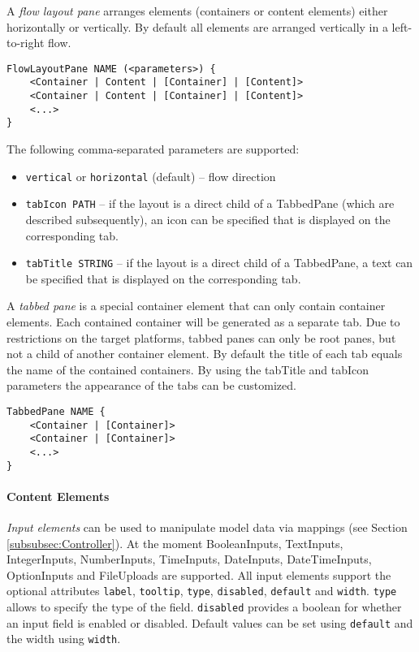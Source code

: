 A \textit{flow layout pane} arranges elements (containers or content elements) either horizontally or vertically. By default all elements are arranged vertically in a left-to-right flow.
\begin{lstlisting}
FlowLayoutPane NAME (<parameters>) {
	<Container | Content | [Container] | [Content]>
	<Container | Content | [Container] | [Content]>
	<...>
}
\end{lstlisting}
The following comma-separated parameters are supported:
\begin{itemize}
\item \lstinline!vertical! or \lstinline!horizontal! (default) -- flow direction
\item \lstinline!tabIcon PATH! -- if the layout is a direct child of a TabbedPane (which are described subsequently), an icon can be specified that is displayed on the corresponding tab.
\item \lstinline!tabTitle STRING! -- if the layout is a direct child of a TabbedPane, a text can be specified that is displayed on the corresponding tab.
\end{itemize}

A \textit{tabbed pane} is a special container element that can only contain container elements. Each contained container will be generated as a separate tab. Due to restrictions on the target platforms, tabbed panes can only be root panes, but not a child of another container element. By default the title of each tab equals the name of the contained containers. By using the tabTitle and tabIcon parameters the appearance of the tabs can be customized.
\begin{lstlisting}
TabbedPane NAME {
	<Container | [Container]>
	<Container | [Container]>
	<...>
}
\end{lstlisting}

\paragraph{Content Elements}
\textit{Input elements} can be used to manipulate model data via mappings (see Section \ref{subsubsec:Controller}). At the moment BooleanInputs, TextInputs, IntegerInputs, NumberInputs, TimeInputs, DateInputs, DateTimeInputs, OptionInputs and FileUploads are supported. All input elements support the optional attributes \lstinline!label!, \lstinline!tooltip!, \lstinline!type!, \lstinline!disabled!, \lstinline!default! and \lstinline!width!. \lstinline!type! allows to specify the type of the field. \lstinline!disabled! provides a boolean for whether an input field is enabled or disabled. Default values can be set using \lstinline!default! and the width using \lstinline!width!.

